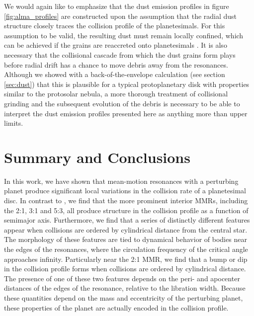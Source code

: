 \documentclass[fleqn,usenatbib]{mnras}
\begin{document}
We would again like to emphasize that the dust emission profiles in figure \ref{fig:alma_profiles} are constructed upon the assumption that the radial dust structure closely traces the 
collision profile of the planetesimals. For this assumption to be valid, the resulting dust must remain locally confined, which can be achieved if the grains are reaccreted onto 
planetesimals \citep{2015SciA....1E0109J}. It is also necessary that the collisional cascade from which the dust grains form plays before radial drift has a chance to move debris away 
from the resonances. Although we showed with a back-of-the-envelope calculation (see section \ref{sec:dust}) that this is plausible for a typical protoplanetary disk with properties similar 
to the protosolar nebula, a more thorough treatment of collisional grinding and the subsequent evolution of the debris is necessary to be able to interpret the dust emission profiles 
presented here as anything more than upper limits.

\section{Summary and Conclusions}\label{sec:conclusions}

In this work, we have shown that mean-motion resonances with a perturbing planet produce significant local variations in the collision rate of a 
planetesimal disc. In contrast to \citet{2000Icar..143...45R}, we find that the more prominent interior MMRs, including the 2:1, 3:1 and 5:3, all 
produce structure in the collision profile as a function of semimajor axis. Furthermore, we find that a series of distinctly different features appear 
when collisions are ordered by cylindrical distance from the central star. The morphology of these features are tied to dynamical behavior of bodies near the edges of the 
resonances, where the circulation frequency of the critical angle approaches infinity. Particularly near the 2:1 MMR, we find that a bump or dip in the collision profile forms when collisions 
are ordered by cylindrical distance. The presence of one of these two features depends on the peri- and apocenter distances of the edges of the resonance, relative to the libration width. 
Because these quantities depend on the mass and eccentricity of the perturbing planet, these properties of the planet are actually encoded in the collision profile.
\end{document}
